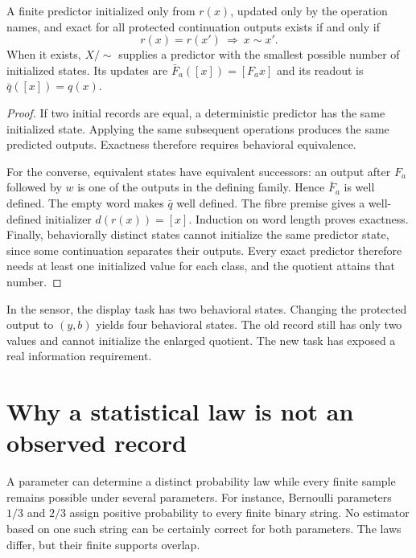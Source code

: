 \begin{theorem}\label{r:behavior}
A finite predictor initialized only from $r(x)$, updated only by the operation names, and exact for all protected continuation outputs exists if and only if
\[
r(x)=r(x')\ \Longrightarrow\ x\sim x'.
\]
When it exists, $X/{\sim}$ supplies a predictor with the smallest possible number of initialized states. Its updates are $\bar F_a([x])=[F_ax]$ and its readout is $\bar q([x])=q(x)$.
\end{theorem}
\begin{proof}
If two initial records are equal, a deterministic predictor has the same initialized state. Applying the same subsequent operations produces the same predicted outputs. Exactness therefore requires behavioral equivalence.

For the converse, equivalent states have equivalent successors: an output after $F_a$ followed by $w$ is one of the outputs in the defining family. Hence $\bar F_a$ is well defined. The empty word makes $\bar q$ well defined. The fibre premise gives a well-defined initializer $d(r(x))=[x]$. Induction on word length proves exactness. Finally, behaviorally distinct states cannot initialize the same predictor state, since some continuation separates their outputs. Every exact predictor therefore needs at least one initialized value for each class, and the quotient attains that number.
\end{proof}

In the sensor, the display task has two behavioral states. Changing the protected output to $(y,b)$ yields four behavioral states. The old record still has only two values and cannot initialize the enlarged quotient. The new task has exposed a real information requirement.

\section{Why a statistical law is not an observed record}
A parameter can determine a distinct probability law while every finite sample remains possible under several parameters. For instance, Bernoulli parameters $1/3$ and $2/3$ assign positive probability to every finite binary string. No estimator based on one such string can be certainly correct for both parameters. The laws differ, but their finite supports overlap.

